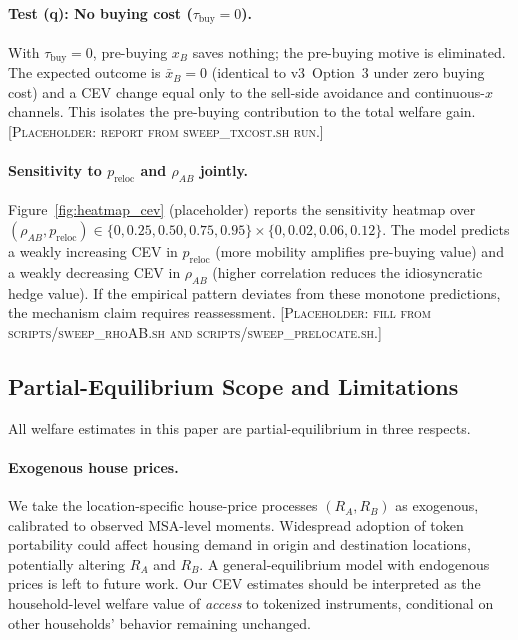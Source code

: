\paragraph{Test (q): No buying cost ($\tau_{\text{buy}} = 0$).}
With $\tau_{\text{buy}} = 0$, pre-buying $x_B$ saves nothing; the
pre-buying motive is eliminated.
The expected outcome is $\bar{x}_B = 0$ (identical to v3~Option~3 under
zero buying cost) and a CEV change equal only to the sell-side avoidance
and continuous-$x$ channels.
This isolates the pre-buying contribution to the total welfare gain.
[\textsc{Placeholder: report from sweep\_txcost.sh run.}]

\paragraph{Sensitivity to $p_{\text{reloc}}$ and $\rho_{AB}$ jointly.}
Figure~\ref{fig:heatmap_cev} (placeholder) reports the sensitivity heatmap
over $(\rho_{AB}, p_{\text{reloc}}) \in \{0, 0.25, 0.50, 0.75, 0.95\} \times
\{0, 0.02, 0.06, 0.12\}$.
The model predicts a weakly increasing CEV in $p_{\text{reloc}}$ (more
mobility amplifies pre-buying value) and a weakly decreasing CEV in
$\rho_{AB}$ (higher correlation reduces the idiosyncratic hedge value).
If the empirical pattern deviates from these monotone predictions,
the mechanism claim requires reassessment.
[\textsc{Placeholder: fill from scripts/sweep\_rhoAB.sh and
scripts/sweep\_prelocate.sh.}]

\subsection{Partial-Equilibrium Scope and Limitations}
\label{sec:discussion:limitations}

All welfare estimates in this paper are partial-equilibrium in three respects.

\paragraph{Exogenous house prices.}
We take the location-specific house-price processes $(R_A, R_B)$ as
exogenous, calibrated to observed MSA-level moments.
Widespread adoption of token portability could affect housing demand in
origin and destination locations, potentially altering $R_A$ and $R_B$.
A general-equilibrium model with endogenous prices is left to future work.
Our CEV estimates should be interpreted as the household-level welfare value
of \emph{access} to tokenized instruments, conditional on other households'
behavior remaining unchanged.

